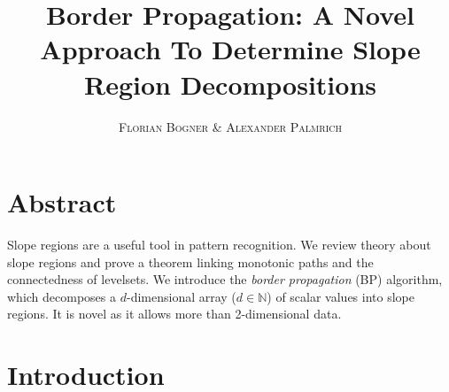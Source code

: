 \documentclass[a4paper,10pt,notitlepage,fullpage]{paper}
\makeatletter
\theoremstyle{plain}
\theoremstyle{definition}
\newcommand*{\toccontents}{\@starttoc{toc}}
\makeatother
\begin{document}
\author{\textsc{Florian Bogner} \& \textsc{Alexander Palmrich}}%
\title{Border Propagation: A Novel Approach To Determine Slope Region Decompositions}%
\maketitle

%
%
%

\section{Abstract}

Slope regions are a useful tool in pattern recognition. We review theory about slope regions and prove a theorem linking monotonic paths and the connectedness of levelsets. We introduce the \emph{border propagation} (BP) algorithm, which decomposes a $d$-dimensional array ($d \in \mathbb N$) of scalar values into slope regions. It is novel as it allows more than 2-dimensional data.





\section{Introduction}
\label{sec:motivating_slope_regions}
\end{document}

